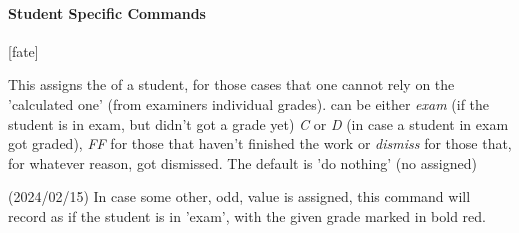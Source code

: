 \documentclass[article,nogeometry,english,tocdepth=3,secdepth=3]{ufrgscca} %
\begin{document}

\paragraph{Student Specific Commands}\label{student-specific-commands}
\begin{codedescribe}[code,update=2023/11/18,update=2024/02/15]{\studentfate}
	\begin{codesyntax}%
		\tsmacro{\studentfate}[fate]{}
	\end{codesyntax}
This assigns the  of a student, for those cases that one cannot rely on the 'calculated one' (from examiners individual grades).  can be either \emph{exam} (if the student is in exam, but didn't got a grade yet) \emph{C} or \emph{D} (in case a student in exam got graded), \emph{FF} for those that haven't finished the work or \emph{dismiss} for those that, for whatever reason, got dismissed. The default is 'do nothing' (no  assigned)
\end{codedescribe}
\begin{tsremark}
(2024/02/15) In case some other, odd, value is assigned, this command will record as if the student is in 'exam', with the given grade  marked in bold red.
\end{tsremark}
\end{document}
